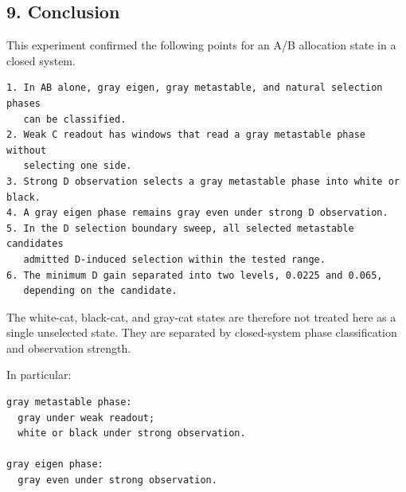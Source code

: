 \documentclass{article}
\begin{document}
\subsection{9. Conclusion}\label{conclusion-1}

This experiment confirmed the following points for an A/B allocation
state in a closed system.

\begin{verbatim}
1. In AB alone, gray eigen, gray metastable, and natural selection phases
   can be classified.
2. Weak C readout has windows that read a gray metastable phase without
   selecting one side.
3. Strong D observation selects a gray metastable phase into white or black.
4. A gray eigen phase remains gray even under strong D observation.
5. In the D selection boundary sweep, all selected metastable candidates
   admitted D-induced selection within the tested range.
6. The minimum D gain separated into two levels, 0.0225 and 0.065,
   depending on the candidate.
\end{verbatim}

The white-cat, black-cat, and gray-cat states are therefore not treated
here as a single unselected state. They are separated by closed-system
phase classification and observation strength.

In particular:

\begin{verbatim}
gray metastable phase:
  gray under weak readout;
  white or black under strong observation.

gray eigen phase:
  gray even under strong observation.
\end{verbatim}
\end{document}
